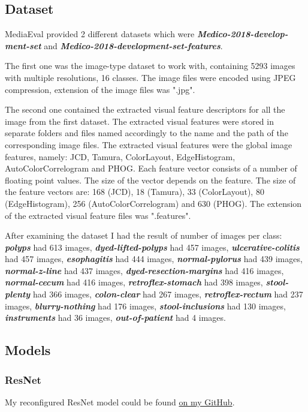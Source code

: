 \subsection{Dataset}
{MediaEval provided 2 different datasets which were \textbf{\emph{{Medico-2018-develop-ment-set}}} and \textbf{\emph{Medico-2018-development-set-features}}.

The first one was the image-type dataset to work with, containing 5293 images with multiple resolutions, 16 classes. The image files were encoded using JPEG compression\cite{jpeg}, extension of the image files was ".jpg". 

The second one contained the extracted visual feature descriptors for all the image from the first dataset. The extracted visual features were stored in separate folders and files named accordingly to the name and the path of the corresponding image files. The extracted visual features were the global image features, namely: JCD, Tamura, ColorLayout, EdgeHistogram, AutoColorCorrelogram and PHOG. Each feature vector consists of a number of floating point values. The size of the vector depends on the feature. The size of the feature vectors are: 168 (JCD), 18 (Tamura), 33 (ColorLayout), 80 (EdgeHistogram), 256 (AutoColorCorrelogram) and 630 (PHOG). The extension of the extracted visual feature files was ".features".

After examining the dataset I had the result of number of images per class: \textbf{\emph{polyps}} had 613 images, \textbf{\emph{dyed-lifted-polyps}} had 457 images, \textbf{\emph{ulcerative-colitis}} had 457 images, \textbf{\emph{esophagitis}} had 444 images, \textbf{\emph{normal-pylorus}} had 439 images, \textbf{\emph{normal-z-line}} had 437 images, \textbf{\emph{dyed-resection-margins}} had 416 images, \textbf{\emph{normal-cecum}} had 416 images, \textbf{\emph{retroflex-stomach}} had 398 images, \textbf{\emph{stool-plenty}} had 366 images, \textbf{\emph{colon-clear}} had 267 images, \textbf{\emph{retroflex-rectum}} had 237 images, \textbf{\emph{blurry-nothing}} had 176 images, \textbf{\emph{stool-inclusions}} had 130 images, \textbf{\emph{instruments}} had 36 images, \textbf{\emph{out-of-patient}} had 4 images.

\subsection{Models}
\subsubsection{ResNet\cite{resnet}}
My reconfigured ResNet model could be found \href{https://github.com/tlvu2697/mediaeval-18--medico-multimedia}{on my GitHub}.

}
